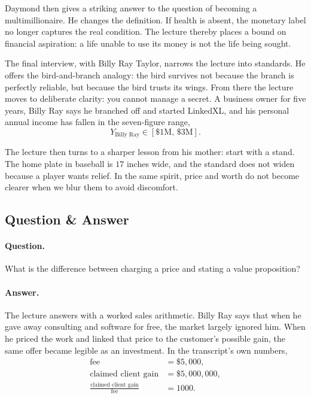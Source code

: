 Daymond then gives a striking answer to the question of becoming a multimillionaire. He changes the definition. If health is absent, the monetary label no longer captures the real condition. The lecture thereby places a bound on financial aspiration: a life unable to use its money is not the life being sought.

The final interview, with Billy Ray Taylor, narrows the lecture into standards. He offers the bird-and-branch analogy: the bird survives not because the branch is perfectly reliable, but because the bird trusts its wings. From there the lecture moves to deliberate clarity: you cannot manage a secret. A business owner for five years, Billy Ray says he branched off and started LinkedXL, and his personal annual income has fallen in the seven-figure range,
\begin{equation}
Y_{\text{Billy Ray}} \in [\$1\text{M},\,\$3\text{M}].
\end{equation}

The lecture then turns to a sharper lesson from his mother: start with a stand. The home plate in baseball is \(17\) inches wide, and the standard does not widen because a player wants relief. In the same spirit, price and worth do not become clearer when we blur them to avoid discomfort.

\subsection{Question \& Answer}

\paragraph{Question.} What is the difference between charging a price and stating a value proposition?

\paragraph{Answer.} The lecture answers with a worked sales arithmetic. Billy Ray says that when he gave away consulting and software for free, the market largely ignored him. When he priced the work and linked that price to the customer's possible gain, the same offer became legible as an investment. In the transcript's own numbers,
\begin{align}
\text{fee} &= \$5{,}000,\\
\text{claimed client gain} &= \$5{,}000{,}000,\\
\frac{\text{claimed client gain}}{\text{fee}} &= 1000.
\end{align}

